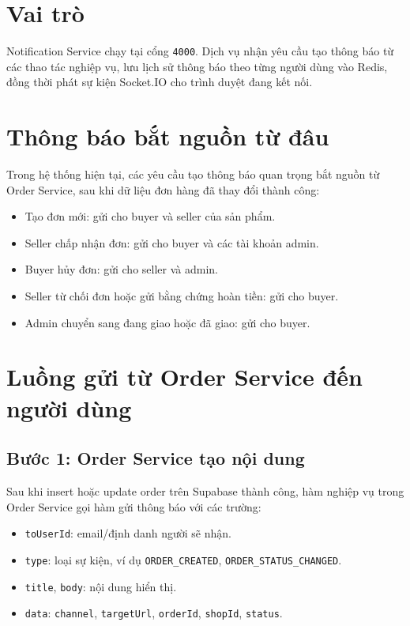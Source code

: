 \documentclass[12pt]{article}
\begin{document}

\section{Vai trò}
Notification Service chạy tại cổng \texttt{4000}. Dịch vụ nhận yêu cầu tạo thông báo từ các thao tác nghiệp vụ, lưu lịch sử thông báo theo từng người dùng vào Redis, đồng thời phát sự kiện Socket.IO cho trình duyệt đang kết nối.

\section{Thông báo bắt nguồn từ đâu}
Trong hệ thống hiện tại, các yêu cầu tạo thông báo quan trọng bắt nguồn từ Order Service, sau khi dữ liệu đơn hàng đã thay đổi thành công:
\begin{itemize}
  \item Tạo đơn mới: gửi cho buyer và seller của sản phẩm.
  \item Seller chấp nhận đơn: gửi cho buyer và các tài khoản admin.
  \item Buyer hủy đơn: gửi cho seller và admin.
  \item Seller từ chối đơn hoặc gửi bằng chứng hoàn tiền: gửi cho buyer.
  \item Admin chuyển sang đang giao hoặc đã giao: gửi cho buyer.
\end{itemize}

\section{Luồng gửi từ Order Service đến người dùng}
\subsection{Bước 1: Order Service tạo nội dung}
Sau khi insert hoặc update order trên Supabase thành công, hàm nghiệp vụ trong Order Service gọi hàm gửi thông báo với các trường:
\begin{itemize}
  \item \texttt{toUserId}: email/định danh người sẽ nhận.
  \item \texttt{type}: loại sự kiện, ví dụ \texttt{ORDER\_CREATED}, \texttt{ORDER\_STATUS\_CHANGED}.
  \item \texttt{title}, \texttt{body}: nội dung hiển thị.
  \item \texttt{data}: \texttt{channel}, \texttt{targetUrl}, \texttt{orderId}, \texttt{shopId}, \texttt{status}.
\end{itemize}
\end{document}
